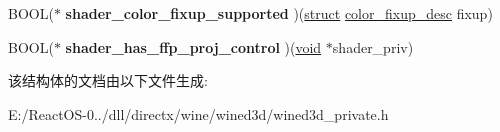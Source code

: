 \begin{DoxyCompactItemize}
\item 
\mbox{\label{structwined3d__shader__backend__ops_ae91144872aacd968ca5f7a0685fddbd2}} 
B\+O\+OL($\ast$ {\bfseries shader\+\_\+color\+\_\+fixup\+\_\+supported} )(\hyperlink{interfacestruct}{struct} \hyperlink{structcolor__fixup__desc}{color\+\_\+fixup\+\_\+desc} fixup)
\item 
\mbox{\label{structwined3d__shader__backend__ops_aab533e8a395f1e0e9e2ed0d7dc72a49d}} 
B\+O\+OL($\ast$ {\bfseries shader\+\_\+has\+\_\+ffp\+\_\+proj\+\_\+control} )(\hyperlink{interfacevoid}{void} $\ast$shader\+\_\+priv)
\end{DoxyCompactItemize}


该结构体的文档由以下文件生成\+:\begin{DoxyCompactItemize}
\item 
E\+:/\+React\+O\+S-\/0../dll/directx/wine/wined3d/wined3d\+\_\+private.\+h\end{DoxyCompactItemize}

